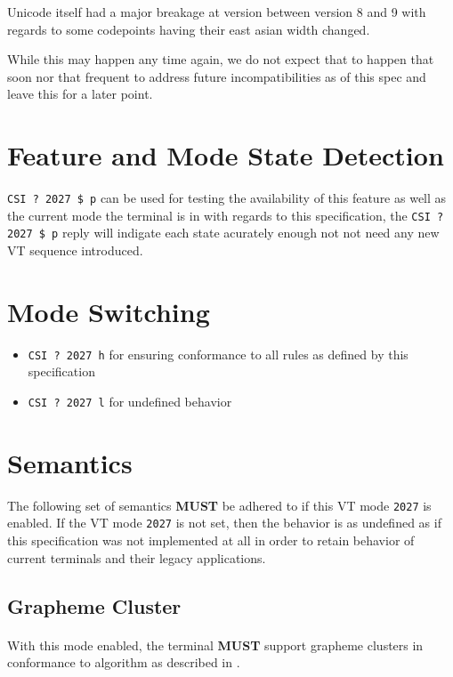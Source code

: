 \documentclass{article}
\newcommand{\code}[1]{\colorbox{light-gray}{\texttt{#1}}}
\newcommand{\DECRQM}[1]{\code{CSI ? #1 \$ p} }
\newcommand{\DECSET}[1]{\code{CSI ? #1 h} }
\newcommand{\DECRST}[1]{\code{CSI ? #1 l} }
\newcommand\VtModeNum{2027}                	%
\newcommand{\UCON}{\DECSET{\VtModeNum{}}}   %
\newcommand{\UCOFF}{\DECRST{\VtModeNum{}}}  %
\newcommand{\UCTEST}{\DECRQM{\VtModeNum{}}} %
\begin{document}
Unicode itself had a major breakage at version between version 8 and 9
with regards to some codepoints having their east asian width changed.

While this may happen any time again, we do not expect that to happen
that soon nor that frequent to address future incompatibilities
as of this spec and leave this for a later point.

\section{Feature and Mode State Detection}

\UCTEST \cite{DECRQM} can be used for testing the availability of this
feature as well as the current mode the terminal is in with regards
to this specification, the \UCTEST reply will indigate each state
acurately enough not not need any new VT sequence introduced.

\section{Mode Switching}

\begin{itemize}
	\item \UCON{} \cite{SM} for ensuring conformance to all rules as defined by this specification
	\item \UCOFF{} \cite{RM} for undefined behavior
\end{itemize}

\section{Semantics}

The following set of semantics \textbf{MUST} be adhered to if this
VT mode \code{\VtModeNum} is enabled.
If the VT mode \code{\VtModeNum} is not set, then the behavior is as undefined
as if this specification was not implemented at all in order to retain
behavior of current terminals and their legacy applications.

\subsection{Grapheme Cluster}

\paragraph*{}
With this mode enabled, the terminal \textbf{MUST} support grapheme clusters
in conformance to algorithm as described in \cite{UTS-29}.
\end{document}
